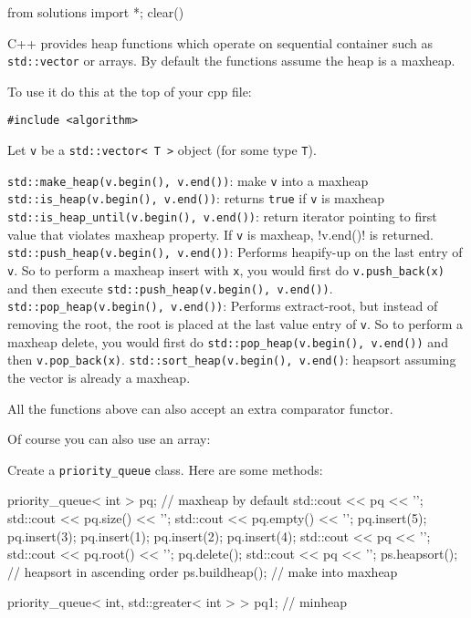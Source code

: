 \begin{python0}
from solutions import *; clear()
\end{python0}

C++ provides heap functions
which operate on sequential container such as \verb!std::vector!
or arrays.
By default the functions assume the heap is a maxheap.

To use it do this at the top of your cpp file:
\begin{Verbatim}[frame=single, fontsize=\small]
#include <algorithm>
\end{Verbatim}

Let \verb!v! be a \verb!std::vector< T >! object (for some type \verb!T!).
\begin{enumerate}[nosep]
  \li \verb!std::make_heap(v.begin(), v.end())!: make \verb!v! into a maxheap
  \li \verb!std::is_heap(v.begin(), v.end())!: returns \verb!true! if \verb!v! is maxheap
  \li \verb!std::is_heap_until(v.begin(), v.end())!:
  return iterator pointing to first value that violates maxheap property.
  If \verb!v! is maxheap, !v.end()! is returned.
  \li \verb!std::push_heap(v.begin(), v.end())!: Performs heapify-up on
  the last entry of \verb!v!.
  So to perform a maxheap insert with \verb!x!, you would first
  do \verb!v.push_back(x)! and then execute
  \verb!std::push_heap(v.begin(), v.end())!.
  \li \verb!std::pop_heap(v.begin(), v.end())!: Performs extract-root,
  but instead of removing the root,
  the root is placed at the last value entry of \verb!v!.
  So to perform a maxheap delete, you would first
  do \verb!std::pop_heap(v.begin(), v.end())!
  and then \verb!v.pop_back(x)!.
  \li \verb!std::sort_heap(v.begin(), v.end()!: heapsort assuming the
  vector is already a maxheap.
\end{enumerate}
All the functions above can also accept an extra comparator functor.

Of course you can also use an array:


\begin{ex}
  Create a \verb!priority_queue! class.
  Here are some methods:
  \begin{console}
priority_queue< int > pq; // maxheap by default
std::cout << pq << '\n';
std::cout << pq.size() << '\n';
std::cout << pq.empty() << '\n';
pq.insert(5);
pq.insert(3);
pq.insert(1);
pq.insert(2);
pq.insert(4);
std::cout << pq << '\n';
std::cout << pq.root() << '\n';
pq.delete();
std::cout << pq << '\n';
ps.heapsort();  // heapsort in ascending order
ps.buildheap(); // make into maxheap

priority_queue< int, std::greater< int > > pq1; // minheap
  \end{console}
\end{ex}
